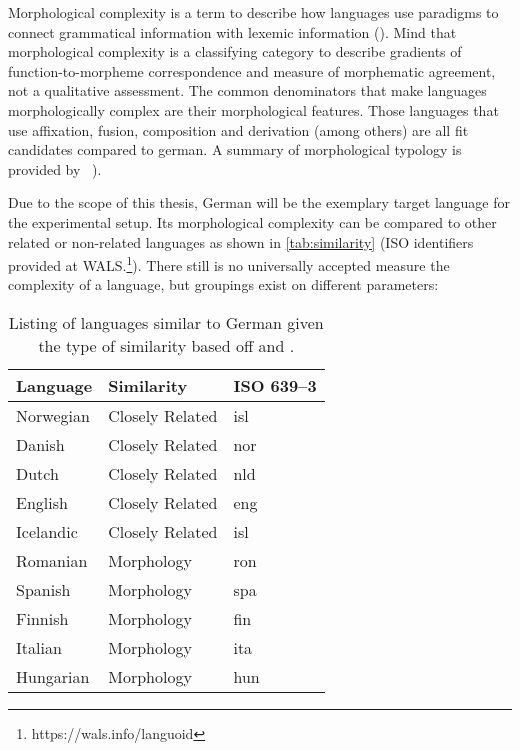Morphological complexity is a term to describe how languages use paradigms to connect grammatical information with lexemic information (\cite{MORPHOLOGICALCOMPLEXITY}).
Mind that morphological complexity is a classifying category to describe gradients of function-to-morpheme correspondence and measure of morphematic agreement, not a qualitative assessment.
The common denominators that make languages morphologically complex are their morphological features.
Those languages that use affixation, fusion, composition and derivation (among others) are all fit candidates compared to german.
A summary of morphological typology is provided by ~\textcite[78--93]{LINGUISTICTYPOLOGY}).

Due to the scope of this thesis, German will be the exemplary target language for the experimental setup.
Its morphological complexity can be compared to other related or non-related languages as shown in \autoref{tab:similarity} (ISO identifiers provided at WALS.\footnote{https://wals.info/languoid}).
There still is no universally accepted measure the complexity of a language, but groupings exist on different parameters:
\\
\begin{table}[h]
    \centering
    \caption[List of similar languages]{Listing of languages similar to German given the type of similarity based off \textcite{lehmann} and \textcite{MORPHOSYNTAXCOMPLEXITY1}.}
    \label{tab:similarity}
    \begin{tabular}{lll}
        \toprule
        \textbf{Language} & \textbf{Similarity} & \textbf{ISO 639--3} \\
        \midrule
        Norwegian & Closely Related & isl \\
        Danish & Closely Related & nor \\
        Dutch & Closely Related & nld \\
        English & Closely Related & eng \\
        Icelandic & Closely Related & isl \\
        Romanian & Morphology & ron \\
        Spanish & Morphology & spa \\
        Finnish & Morphology & fin \\
        Italian & Morphology & ita \\
        Hungarian & Morphology & hun \\
        \bottomrule
    \end{tabular}

\end{table}

